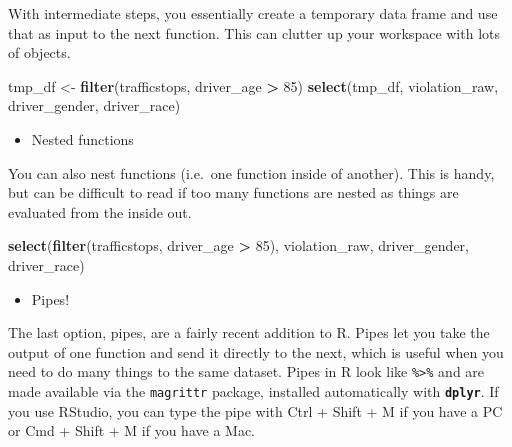 \documentclass[]{book}
\newenvironment{Shaded}{\begin{snugshade}}{\end{snugshade}}
\newcommand{\KeywordTok}[1]{\textcolor[rgb]{0.13,0.29,0.53}{\textbf{#1}}}
\newcommand{\DecValTok}[1]{\textcolor[rgb]{0.00,0.00,0.81}{#1}}
\newcommand{\StringTok}[1]{\textcolor[rgb]{0.31,0.60,0.02}{#1}}
\newcommand{\OperatorTok}[1]{\textcolor[rgb]{0.81,0.36,0.00}{\textbf{#1}}}
\newcommand{\NormalTok}[1]{#1}
\providecommand{\tightlist}{%
  \setlength{\itemsep}{0pt}\setlength{\parskip}{0pt}}
\theoremstyle{definition}
\theoremstyle{definition}
\theoremstyle{definition}
\theoremstyle{remark}
\begin{document}
With intermediate steps, you essentially create a temporary data frame
and use that as input to the next function. This can clutter up your
workspace with lots of objects.

\begin{Shaded}
\begin{Highlighting}[]
\NormalTok{tmp_df <-}\StringTok{ }\KeywordTok{filter}\NormalTok{(trafficstops, driver_age }\OperatorTok{>}\StringTok{ }\DecValTok{85}\NormalTok{)}
\KeywordTok{select}\NormalTok{(tmp_df, violation_raw, driver_gender, driver_race)}
\end{Highlighting}
\end{Shaded}

\begin{itemize}
\tightlist
\item
  Nested functions
\end{itemize}

You can also nest functions (i.e.~one function inside of another). This
is handy, but can be difficult to read if too many functions are nested
as things are evaluated from the inside out.

\begin{Shaded}
\begin{Highlighting}[]
\KeywordTok{select}\NormalTok{(}\KeywordTok{filter}\NormalTok{(trafficstops, driver_age }\OperatorTok{>}\StringTok{ }\DecValTok{85}\NormalTok{), violation_raw, driver_gender, driver_race)}
\end{Highlighting}
\end{Shaded}

\begin{itemize}
\tightlist
\item
  Pipes!
\end{itemize}

The last option, pipes, are a fairly recent addition to R. Pipes let you
take the output of one function and send it directly to the next, which
is useful when you need to do many things to the same dataset. Pipes in
R look like \texttt{\%\textgreater{}\%} and are made available via the
\texttt{magrittr} package, installed automatically with
\textbf{\texttt{dplyr}}. If you use RStudio, you can type the pipe with
Ctrl + Shift + M if you have a PC or Cmd + Shift + M if you have a Mac.

\begin{Shaded}
\end{Shaded}
\end{document}
